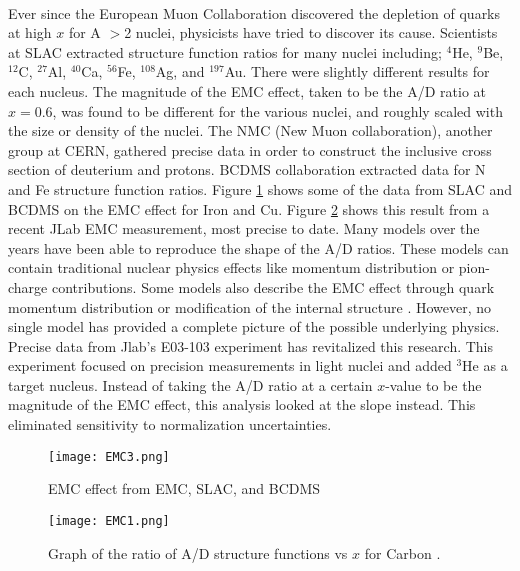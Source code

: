 \paragraph{}Ever since the European Muon Collaboration discovered the depletion of quarks at high $x$ for A $>$2 nuclei, physicists have tried to discover its cause. Scientists at SLAC extracted structure function ratios for many nuclei including; $^4$He, $^9$Be, $^{12}$C, $^{27}$Al, $^{40}$Ca, $^{56}$Fe, $^{108}$Ag, and $^{197}$Au. There were slightly different results for each nucleus. The magnitude of the EMC effect, taken to be the A/D ratio at $x=0.6$, was found to be different for the various nuclei, and roughly scaled with the size or density of the nuclei. The NMC (New Muon collaboration), another group at CERN, gathered precise data in order to construct the inclusive cross section of deuterium and protons. BCDMS collaboration extracted data for N and Fe structure function ratios. Figure \ref{EMC3} shows some of the data from SLAC and BCDMS on the EMC effect for Iron and Cu. Figure \ref{EMC 1} shows this result from a recent JLab EMC measurement, most precise to date. Many models over the years have been able to reproduce the shape of the A/D ratios. These models can contain traditional nuclear physics effects like momentum distribution or pion-charge contributions. Some models also describe the EMC effect through quark momentum distribution or modification of the internal structure \cite{Norton, piler, arri, DF, gomez}. However, no single model has provided a complete picture of the possible underlying physics. Precise data from Jlab's E03-103 experiment has revitalized this research. This experiment focused on precision measurements in light nuclei and added $^{3}$He as a target nucleus. Instead of taking the A/D ratio at a certain $x$-value to be the magnitude of the EMC effect, this analysis looked at the slope instead. This eliminated sensitivity to normalization uncertainties.

\begin{figure}[h]
\centering
\caption{EMC effect from EMC, SLAC, and BCDMS \cite{Norton}}
\label{EMC3}
\centering
\texttt{[image: EMC3.png]}
\end{figure}

\begin{figure}[h]
\centering
 \caption{ Graph of the ratio of A/D structure functions vs $x$ for Carbon \cite{CC}.}
 \label{EMC 1}
 \texttt{[image: EMC1.png]} 
 \end{figure} 
 

